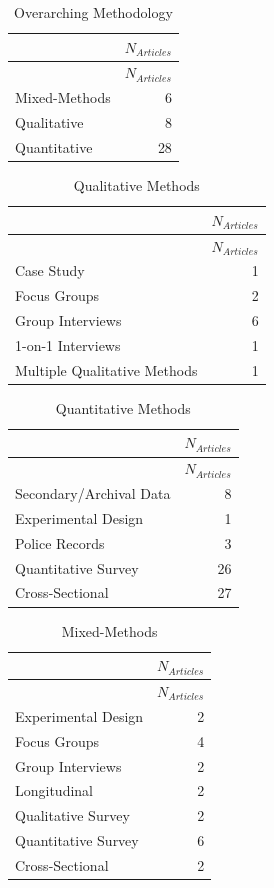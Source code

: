 \documentclass[]{tufte-handout}
\begin{document}
\begin{longtable}[]{@{}lr@{}}
\caption{Overarching Methodology}\tabularnewline
\toprule
& \(N_{Articles}\)\tabularnewline
\midrule
\endfirsthead
\toprule
& \(N_{Articles}\)\tabularnewline
\midrule
\endhead
Mixed-Methods & 6\tabularnewline
Qualitative & 8\tabularnewline
Quantitative & 28\tabularnewline
\bottomrule
\end{longtable}

\begin{longtable}[]{@{}lr@{}}
\caption{Qualitative Methods}\tabularnewline
\toprule
& \(N_{Articles}\)\tabularnewline
\midrule
\endfirsthead
\toprule
& \(N_{Articles}\)\tabularnewline
\midrule
\endhead
Case Study & 1\tabularnewline
Focus Groups & 2\tabularnewline
Group Interviews & 6\tabularnewline
1-on-1 Interviews & 1\tabularnewline
Multiple Qualitative Methods & 1\tabularnewline
\bottomrule
\end{longtable}

\begin{longtable}[]{@{}lr@{}}
\caption{Quantitative Methods}\tabularnewline
\toprule
& \(N_{Articles}\)\tabularnewline
\midrule
\endfirsthead
\toprule
& \(N_{Articles}\)\tabularnewline
\midrule
\endhead
Secondary/Archival Data & 8\tabularnewline
Experimental Design & 1\tabularnewline
Police Records & 3\tabularnewline
Quantitative Survey & 26\tabularnewline
Cross-Sectional & 27\tabularnewline
\bottomrule
\end{longtable}

\begin{longtable}[]{@{}lr@{}}
\caption{Mixed-Methods}\tabularnewline
\toprule
& \(N_{Articles}\)\tabularnewline
\midrule
\endfirsthead
\toprule
& \(N_{Articles}\)\tabularnewline
\midrule
\endhead
Experimental Design & 2\tabularnewline
Focus Groups & 4\tabularnewline
Group Interviews & 2\tabularnewline
Longitudinal & 2\tabularnewline
Qualitative Survey & 2\tabularnewline
Quantitative Survey & 6\tabularnewline
Cross-Sectional & 2\tabularnewline
\bottomrule
\end{longtable}
\end{document}
